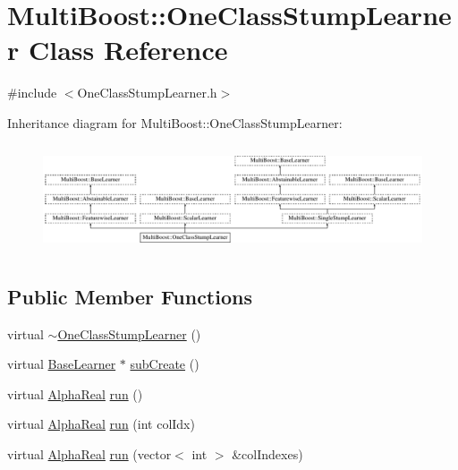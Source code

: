 \hypertarget{classMultiBoost_1_1OneClassStumpLearner}{
\section{MultiBoost::OneClassStumpLearner Class Reference}
\label{classMultiBoost_1_1OneClassStumpLearner}
}


{\ttfamily \#include $<$OneClassStumpLearner.h$>$}

Inheritance diagram for MultiBoost::OneClassStumpLearner:\begin{figure}[H]
\begin{center}
\leavevmode
\includegraphics[height=3.211009cm]{classMultiBoost_1_1OneClassStumpLearner}
\end{center}
\end{figure}
\subsection*{Public Member Functions}
\begin{DoxyCompactItemize}
\item 
virtual \hyperlink{classMultiBoost_1_1OneClassStumpLearner_a1950c8ee328113ce758232175e30e197}{$\sim$OneClassStumpLearner} ()
\item 
virtual \hyperlink{classMultiBoost_1_1BaseLearner}{BaseLearner} $\ast$ \hyperlink{classMultiBoost_1_1OneClassStumpLearner_ac00d7c627e63188969086c4731d1e108}{subCreate} ()
\item 
virtual \hyperlink{Defaults_8h_a80184c4fd10ab70a1a17c5f97dcd1563}{AlphaReal} \hyperlink{classMultiBoost_1_1OneClassStumpLearner_ab2ef660fcf6f95e176901a82c1904fe9}{run} ()
\item 
virtual \hyperlink{Defaults_8h_a80184c4fd10ab70a1a17c5f97dcd1563}{AlphaReal} \hyperlink{classMultiBoost_1_1OneClassStumpLearner_a01ca9c278f874d051382080b1eff990f}{run} (int colIdx)
\item 
virtual \hyperlink{Defaults_8h_a80184c4fd10ab70a1a17c5f97dcd1563}{AlphaReal} \hyperlink{classMultiBoost_1_1OneClassStumpLearner_a0c4f50119ccb0eda9a3857fddd00fbae}{run} (vector$<$ int $>$ \&colIndexes)
\end{DoxyCompactItemize}


